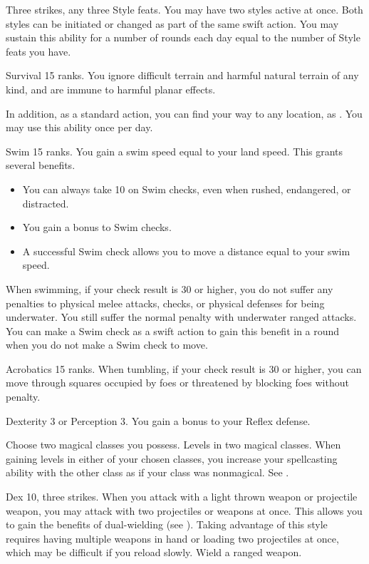 \featpres Three strikes, any three Style feats.
\featben You may have two styles active at once.
Both styles can be initiated or changed as part of the same swift action.
You may sustain this ability for a number of rounds each day equal to the number of Style feats you have.

\featpre Survival 15 ranks.
\featben You ignore difficult terrain and harmful natural terrain of any kind, and are immune to harmful planar effects.

In addition, as a standard action, you can find your way to any location, as .
You may use this ability once per day.

\featpre Swim 15 ranks.
\featben You gain a swim speed equal to your land speed.
This grants several benefits.
\begin{itemize}
    \item You can always take 10 on Swim checks, even when rushed, endangered, or distracted.
    \item You gain a  bonus to Swim checks.
    \item A successful Swim check allows you to move a distance equal to your swim speed.
\end{itemize}

When swimming, if your check result is 30 or higher, you do not suffer any penalties to physical melee attacks, checks, or physical defenses for being underwater.
You still suffer the normal penalty with underwater ranged attacks.
You can make a Swim check as a swift action to gain this benefit in a round when you do not make a Swim check to move.

\featpre Acrobatics 15 ranks.
\featben When tumbling, if your check result is 30 or higher, you can move through squares occupied by foes or threatened by blocking foes without penalty.

\featpre Dexterity 3 or Perception 3.
\featben You gain a  bonus to your Reflex defense.

Choose two magical classes you possess.
\featpres
Levels in two magical classes.
\featben When gaining levels in either of your chosen classes, you increase your spellcasting ability with the other class as if your class was nonmagical.
See .

\featpres Dex 10, three strikes.
\featben When you attack with a light thrown weapon or projectile weapon, you may attack with two projectiles or weapons at once.
This allows you to gain the benefits of dual-wielding (see ).
Taking advantage of this style requires having multiple weapons in hand or loading two projectiles at once, which may be difficult if you reload slowly.
\stylereq Wield a ranged weapon.

